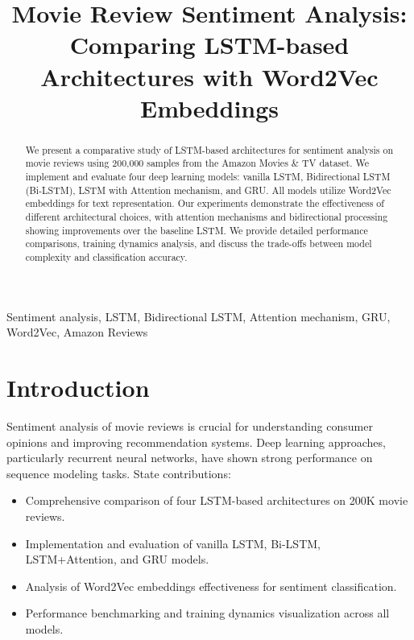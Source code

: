 \documentclass[conference]{IEEEtran}
\begin{document}
\title{Movie Review Sentiment Analysis: Comparing LSTM-based Architectures with Word2Vec Embeddings}

\author{
}

\maketitle

\begin{abstract}
We present a comparative study of LSTM-based architectures for sentiment analysis on movie reviews using 200,000 samples from the Amazon Movies \& TV dataset. We implement and evaluate four deep learning models: vanilla LSTM, Bidirectional LSTM (Bi-LSTM), LSTM with Attention mechanism, and GRU. All models utilize Word2Vec embeddings for text representation. Our experiments demonstrate the effectiveness of different architectural choices, with attention mechanisms and bidirectional processing showing improvements over the baseline LSTM. We provide detailed performance comparisons, training dynamics analysis, and discuss the trade-offs between model complexity and classification accuracy.
\end{abstract}

\begin{IEEEkeywords}
Sentiment analysis, LSTM, Bidirectional LSTM, Attention mechanism, GRU, Word2Vec, Amazon Reviews
\end{IEEEkeywords}

\section{Introduction}
\label{sec:intro}
Sentiment analysis of movie reviews is crucial for understanding consumer opinions and improving recommendation systems. Deep learning approaches, particularly recurrent neural networks, have shown strong performance on sequence modeling tasks. State contributions:
\begin{itemize}
\item Comprehensive comparison of four LSTM-based architectures on 200K movie reviews.
\item Implementation and evaluation of vanilla LSTM, Bi-LSTM, LSTM+Attention, and GRU models.
\item Analysis of Word2Vec embeddings effectiveness for sentiment classification.
\item Performance benchmarking and training dynamics visualization across all models.
\end{itemize}
\end{document}
